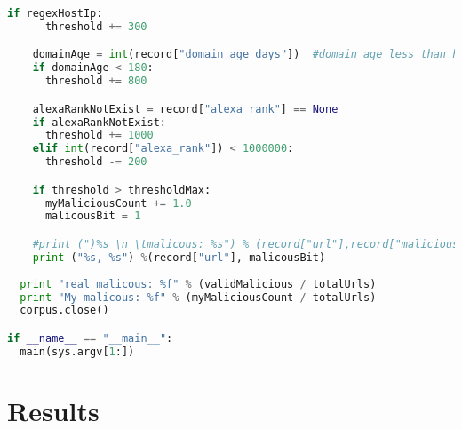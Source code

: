 \documentclass[letterpaper,12pt,titlepage,onecolumn]{IEEEtran}
\begin{document}
\begin{lstlisting}[language=Python]
    if regexHostIp:
      threshold += 300

    domainAge = int(record["domain_age_days"])  #domain age less than half a year
    if domainAge < 180:
      threshold += 800

    alexaRankNotExist = record["alexa_rank"] == None
    if alexaRankNotExist:
      threshold += 1000
    elif int(record["alexa_rank"]) < 1000000:
      threshold -= 200

    if threshold > thresholdMax:
      myMaliciousCount += 1.0
      malicousBit = 1

    #print (")%s \n \tmalicous: %s") % (record["url"],record["malicious_url"])
    print ("%s, %s") %(record["url"], malicousBit)
    
  print "real malicous: %f" % (validMalicious / totalUrls)
  print "My malicous: %f" % (myMaliciousCount / totalUrls)
  corpus.close()

if __name__ == "__main__":
  main(sys.argv[1:])
\end{lstlisting}

\section{Results}
\end{document}
